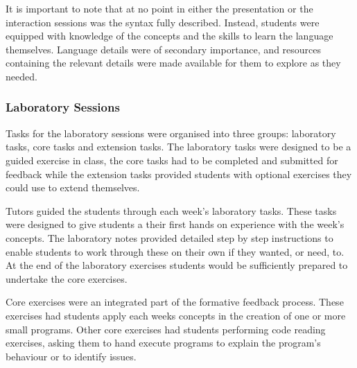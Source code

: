 It is important to note that at no point in either the presentation or the interaction sessions was the syntax fully described. Instead, students were equipped with knowledge of the concepts and the skills to learn the language themselves. Language details were of secondary importance, and resources containing the relevant details were made available for them to explore as they needed.



\subsubsection{Laboratory Sessions} %
\label{ssub:laboratory_sessions}

Tasks for the laboratory sessions were organised into three groups: laboratory tasks, core tasks and extension tasks. The laboratory tasks were designed to be a guided exercise in class, the core tasks had to be completed and submitted for feedback while the extension tasks provided students with optional exercises they could use to extend themselves.

Tutors guided the students through each week's laboratory tasks. These tasks were designed to give students a their first hands on experience with the week's concepts. The laboratory notes provided detailed step by step instructions to enable students to work through these on their own if they wanted, or need, to. At the end of the laboratory exercises students would be sufficiently prepared to undertake the core exercises.

Core exercises were an integrated part of the formative feedback process. These exercises had students apply each weeks concepts in the creation of one or more small programs. Other core exercises had students performing code reading exercises, asking them to hand execute programs to explain the program's behaviour or to identify issues. 


